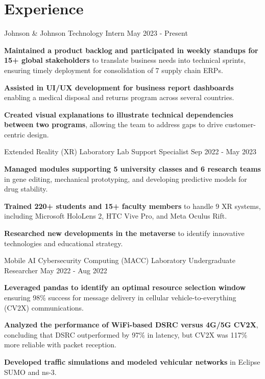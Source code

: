 \section{Experience}
\resumeSubHeadingListStart

\resumeExp
{Johnson \& Johnson}
{Technology Intern}
{}
{May 2023 - Present}
\vspace{1mm}
\resumeItemListStart
\item[\tiny$\bullet$] \textbf{Maintained a product backlog and participated in weekly standups for 15+ global stakeholders} to translate business needs into technical sprints, ensuring timely deployment for consolidation of 7 supply chain ERPs.
\item [\tiny$\bullet$] \textbf{Assisted in UI/UX development for business report dashboards} enabling a medical disposal and returns program across several countries.
\item [\tiny$\bullet$] \textbf{Created visual explanations to illustrate technical dependencies between two programs}, allowing the team to address gaps to drive customer-centric design.
\resumeItemListEnd

\resumeExp
{Extended Reality (XR) Laboratory}
{Lab Support Specialist}
{}
{Sep 2022 - May 2023}
\vspace{1mm}
\resumeItemListStart
\item[\tiny$\bullet$] \textbf{Managed modules supporting 5 university classes and 6 research teams} in gene editing, mechanical prototyping, and developing predictive models for drug stability.
\item[\tiny$\bullet$] \textbf{Trained 220+ students and 15+ faculty members} to handle 9 XR systems, including Microsoft HoloLens 2, HTC Vive Pro, and Meta Oculus Rift.
\item[\tiny$\bullet$] \textbf{Researched new developments in the metaverse} to identify innovative technologies and educational strategy.
\resumeItemListEnd

\resumeExp
{Mobile AI Cybersecurity Computing (MACC) Laboratory}
{Undergraduate Researcher}
{}
{May 2022 - Aug 2022}
\vspace{1mm}
\resumeItemListStart
\item[\tiny$\bullet$] \textbf{Leveraged pandas to identify an optimal resource selection window} ensuring 98\% success for message delivery in cellular vehicle-to-everything (CV2X) communications.
\item[\tiny$\bullet$] \textbf{Analyzed the performance of WiFi-based DSRC versus 4G/5G CV2X}, concluding that DSRC outperformed by 97\% in latency, but CV2X was 117\% more reliable with packet reception.
\item[\tiny$\bullet$] \textbf{Developed traffic simulations and modeled vehicular networks} in Eclipse SUMO and ns-3.
\resumeItemListEnd

\resumeSubHeadingListEnd
\vspace{-7mm}